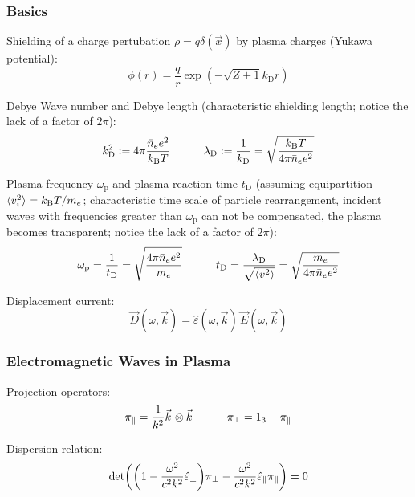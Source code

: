 		\subsubsection{Basics}
			Shielding of a charge pertubation $\rho=q\delta(\vec{x})$ by plasma charges (Yukawa potential):
			\begin{equation}
				\phi(r) = \frac{q}{r} \exp(-\sqrt{Z+1}k_\text{D} r)
			\end{equation}

			\noindent
			Debye Wave number and Debye length (characteristic shielding length; notice the lack of a factor of $2\pi$):
			\begin{equation}
				k_\text{D}^2 := 4\pi \frac{\bar{n}_e e^2}{k_{\text{B}} T} \hspace{30pt}
				\lambda_\text{D} := \frac{1}{k_\text{D}} = \sqrt{\frac{k_{\text{B}} T}{4\pi \bar{n}_e e^2}}
			\end{equation}

			\noindent
			Plasma frequency $\omega_\text{p}$ and plasma reaction time $t_\text{D}$ (assuming equipartition $\langle v_i^2 \rangle = k_{\text{B}} T / m_e$; characteristic time scale of particle rearrangement, incident waves with frequencies greater than $\omega_\text{p}$ can not be compensated, the plasma becomes transparent; notice the lack of a factor of $2\pi$):
			\begin{equation}
				\omega_\text{p} = \frac{1}{t_\text{D}} = \sqrt{\frac{4\pi\bar{n}_e e^2}{m_e}} \hspace{30pt}
				t_\text{D} = \frac{\lambda_\text{D}}{\sqrt{\langle v^2 \rangle}} = \sqrt{\frac{m_e}{4\pi \bar{n}_e e^2}}
			\end{equation}

			\noindent
			Displacement current:
			\begin{equation}
				\vec{D}(\omega,\vec{k})  = \hat{\varepsilon}(\omega, \vec{k}) \, \vec{E}(\omega, \vec{k})
			\end{equation}

		\subsubsection{Electromagnetic Waves in Plasma}
			Projection operators:
			\begin{equation}
				\pi_\parallel = \frac{1}{k^2}\vec{k}\otimes\vec{k}
				\hsp
				\pi_\perp = 1_3 - \pi_\parallel
			\end{equation}

			\noindent
			Dispersion relation:
			\begin{equation}
				\det(\qty(1 - \frac{\omega^2}{c^2 k^2}\hat{\varepsilon}_\perp) \pi_\perp - \frac{\omega^2}{c^2 k^2}\hat{\varepsilon}_\parallel \pi_\parallel) = 0
			\end{equation}

